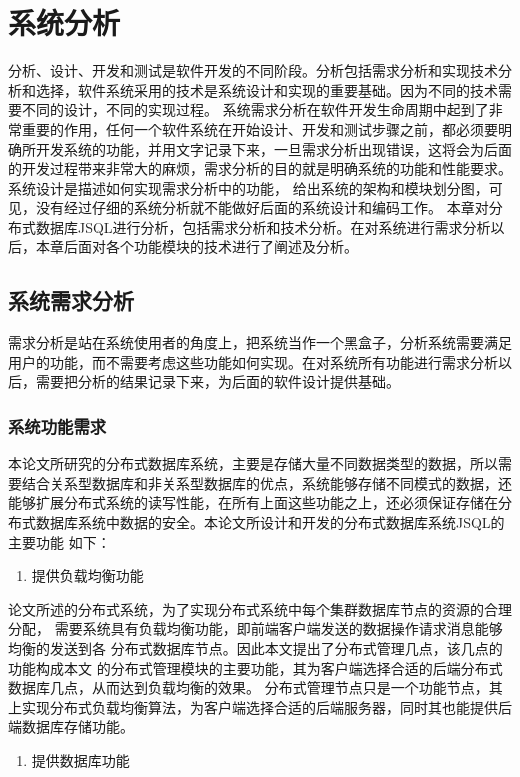 
\chapter{系统分析}
分析、设计、开发和测试是软件开发的不同阶段。分析包括需求分析和实现技术分析和选择，软件系统采用的技术是系统设计和实现的重要基础。因为不同的技术需要不同的设计，不同的实现过程。
系统需求分析在软件开发生命周期中起到了非常重要的作用，任何一个软件系统在开始设计、开发和测试步骤之前，都必须要明确所开发系统的功能，并用文字记录下来，一旦需求分析出现错误，这将会为后面的开发过程带来非常大的麻烦，需求分析的目的就是明确系统的功能和性能要求。系统设计是描述如何实现需求分析中的功能，
给出系统的架构和模块划分图，可见，没有经过仔细的系统分析就不能做好后面的系统设计和编码工作。
本章对分布式数据库JSQL进行分析，包括需求分析和技术分析。在对系统进行需求分析以后，本章后面对各个功能模块的技术进行了阐述及分析。
\section{系统需求分析}
需求分析是站在系统使用者的角度上，把系统当作一个黑盒子，分析系统需要满足用户的功能，而不需要考虑这些功能如何实现。在对系统所有功能进行需求分析以后，需要把分析的结果记录下来，为后面的软件设计提供基础。
\subsection{系统功能需求}
本论文所研究的分布式数据库系统，主要是存储大量不同数据类型的数据，所以需要结合关系型数据库和非关系型数据库的优点，系统能够存储不同模式的数据，还能够扩展分布式系统的读写性能，在所有上面这些功能之上，还必须保证存储在分布式数据库系统中数据的安全。本论文所设计和开发的分布式数据库系统JSQL的主要功能
如下：


	\begin{enumerate}
		\item 提供负载均衡功能
	\end{enumerate}

	论文所述的分布式系统，为了实现分布式系统中每个集群数据库节点的资源的合理分配，
	需要系统具有负载均衡功能，即前端客户端发送的数据操作请求消息能够均衡的发送到各
	分布式数据库节点。因此本文提出了分布式管理几点，该几点的功能构成本文
	的分布式管理模块的主要功能，其为客户端选择合适的后端分布式数据库几点，从而达到负载均衡的效果。
	分布式管理节点只是一个功能节点，其上实现分布式负载均衡算法，为客户端选择合适的后端服务器，同时其也能提供后端数据库存储功能。
	
	\begin{enumerate}[resume]
		\item 提供数据库功能
	\end{enumerate}

